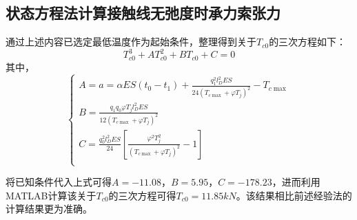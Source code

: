 \subsection{状态方程法计算接触线无弛度时承力索张力}
通过上述内容已选定最低温度作为起始条件，整理得到关于$T_{c0}$的三次方程如下：
$$
T_{c0}^{3}+AT_{c0}^{2}+BT_{c0}+C=0
$$
其中，
$$
\begin{cases}
	A=a=\alpha ES\left( t_0-t_1 \right) +\frac{q_{1}^{2}l_{D}^{2}ES}{24\left( T_{c\max}+\varphi T_j \right) ^2}-T_{c\max}\\
	B=\frac{q_1q_0\varphi T_jl_{D}^{2}ES}{12\left( T_{c\max}+\varphi T_j \right) ^2}\\
	C=\frac{q_{0}^{2}l_{D}^{2}ES}{24}\left[ \frac{\varphi ^2T_{j}^{2}}{\left( T_{c\max}+\varphi T_j \right) ^2}-1 \right]\\
\end{cases}
$$

将已知条件代入上式可得$A=-11.08$，$B=5.95$，$C=-178.23$，进而利用MATLAB计算该关于$T_{c0}$的三次方程可得$T_{c0}=11.85kN$。该结果相比前述经验法的计算结果更为准确。
